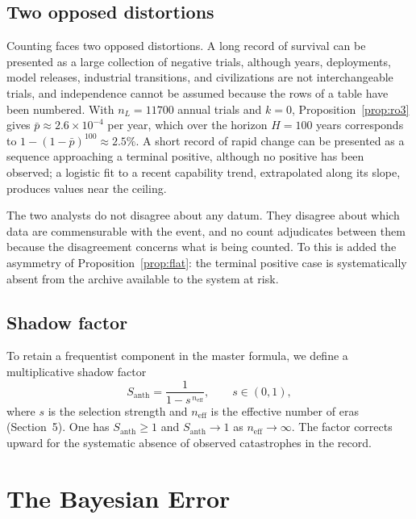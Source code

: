 \documentclass[11pt]{article}
\theoremstyle{remark}
\newcommand{\Santh}{S_{\mathrm{anth}}}
\begin{document}
\subsection{Two opposed distortions}

Counting faces two opposed distortions. A long record of survival can be presented as a large collection of negative trials, although years, deployments, model releases, industrial transitions, and civilizations are not interchangeable trials, and independence cannot be assumed because the rows of a table have been numbered. With $n_L=11700$ annual trials and $k=0$, Proposition~\ref{prop:ro3} gives $\bar p\approx 2.6\times10^{-4}$ per year, which over the horizon $H=100$ years corresponds to $1-(1-\bar p)^{100}\approx 2.5\%$. A short record of rapid change can be presented as a sequence approaching a terminal positive, although no positive has been observed; a logistic fit to a recent capability trend, extrapolated along its slope, produces values near the ceiling.

The two analysts do not disagree about any datum. They disagree about which data are commensurable with the event, and no count adjudicates between them because the disagreement concerns what is being counted. To this is added the asymmetry of Proposition~\ref{prop:flat}: the terminal positive case is systematically absent from the archive available to the system at risk.

\subsection{Shadow factor}

To retain a frequentist component in the master formula, we define a multiplicative shadow factor
\begin{equation}\label{eq:shadow}
\Santh=\frac{1}{1-s^{\,n_{\mathrm{eff}}}},\qquad s\in(0,1),
\end{equation}
where $s$ is the selection strength and $n_{\mathrm{eff}}$ is the effective number of eras (Section~5). One has $\Santh\ge 1$ and $\Santh\to 1$ as $n_{\mathrm{eff}}\to\infty$. The factor corrects upward for the systematic absence of observed catastrophes in the record.

\section{The Bayesian Error}\label{sec:bayes}
\end{document}
